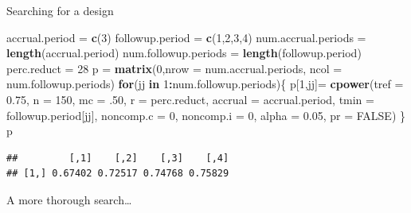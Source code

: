 \documentclass[ignorenonframetext,]{beamer}
\newenvironment{Shaded}{\begin{snugshade}}{\end{snugshade}}
\newcommand{\ControlFlowTok}[1]{\textcolor[rgb]{0.13,0.29,0.53}{\textbf{#1}}}
\newcommand{\DataTypeTok}[1]{\textcolor[rgb]{0.13,0.29,0.53}{#1}}
\newcommand{\DecValTok}[1]{\textcolor[rgb]{0.00,0.00,0.81}{#1}}
\newcommand{\FloatTok}[1]{\textcolor[rgb]{0.00,0.00,0.81}{#1}}
\newcommand{\KeywordTok}[1]{\textcolor[rgb]{0.13,0.29,0.53}{\textbf{#1}}}
\newcommand{\NormalTok}[1]{#1}
\newcommand{\OperatorTok}[1]{\textcolor[rgb]{0.81,0.36,0.00}{\textbf{#1}}}
\newcommand{\OtherTok}[1]{\textcolor[rgb]{0.56,0.35,0.01}{#1}}
\newcommand{\StringTok}[1]{\textcolor[rgb]{0.31,0.60,0.02}{#1}}
\begin{document}
\begin{frame}[fragile]{%
\protect\hypertarget{searching-for-a-design}{%
Searching for a design}}

\scriptsize

\begin{Shaded}
\begin{Highlighting}[]
\NormalTok{accrual.period =}\StringTok{ }\KeywordTok{c}\NormalTok{(}\DecValTok{3}\NormalTok{)}
\NormalTok{followup.period =}\StringTok{ }\KeywordTok{c}\NormalTok{(}\DecValTok{1}\NormalTok{,}\DecValTok{2}\NormalTok{,}\DecValTok{3}\NormalTok{,}\DecValTok{4}\NormalTok{)}
\NormalTok{num.accrual.periods =}\StringTok{ }\KeywordTok{length}\NormalTok{(accrual.period)}
\NormalTok{num.followup.periods =}\StringTok{ }\KeywordTok{length}\NormalTok{(followup.period)}
\NormalTok{perc.reduct =}\StringTok{ }\DecValTok{28}
\NormalTok{p =}\StringTok{ }\KeywordTok{matrix}\NormalTok{(}\DecValTok{0}\NormalTok{,}\DataTypeTok{nrow =}\NormalTok{ num.accrual.periods, }\DataTypeTok{ncol =}\NormalTok{ num.followup.periods)}
\ControlFlowTok{for}\NormalTok{(jj }\ControlFlowTok{in} \DecValTok{1}\OperatorTok{:}\NormalTok{num.followup.periods)\{}
\NormalTok{  p[}\DecValTok{1}\NormalTok{,jj]=}\StringTok{ }\KeywordTok{cpower}\NormalTok{(}\DataTypeTok{tref =} \FloatTok{0.75}\NormalTok{, }\DataTypeTok{n =} \DecValTok{150}\NormalTok{, }\DataTypeTok{mc =} \FloatTok{.50}\NormalTok{, }\DataTypeTok{r =}\NormalTok{ perc.reduct, }
       \DataTypeTok{accrual =}\NormalTok{ accrual.period, }\DataTypeTok{tmin =}\NormalTok{ followup.period[jj], }
       \DataTypeTok{noncomp.c =} \DecValTok{0}\NormalTok{, }\DataTypeTok{noncomp.i =} \DecValTok{0}\NormalTok{, }
       \DataTypeTok{alpha =} \FloatTok{0.05}\NormalTok{, }\DataTypeTok{pr =} \OtherTok{FALSE}\NormalTok{)}
\NormalTok{  \}}
\NormalTok{p}
\end{Highlighting}
\end{Shaded}

\begin{verbatim}
##         [,1]    [,2]    [,3]    [,4]
## [1,] 0.67402 0.72517 0.74768 0.75829
\end{verbatim}

\normalsize

A more thorough search\ldots

\end{frame}
\end{document}
